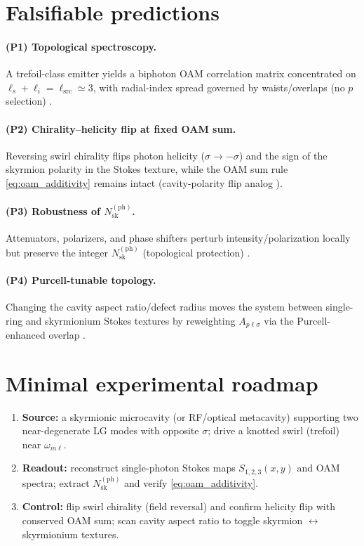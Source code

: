 \documentclass[12pt]{article}
\begin{document}
\section{Falsifiable predictions}

\paragraph{(P1) Topological spectroscopy.} A trefoil-class emitter yields a biphoton OAM correlation matrix concentrated on $\ell_s+\ell_i=\ell_\textrm{src}\simeq 3$, with radial-index spread governed by waists/overlaps (no $p$ selection) \cite{Walborn2010SPDCReview,Kopf2025OAMConservation}.

\paragraph{(P2) Chirality--helicity flip at fixed OAM sum.} Reversing swirl chirality flips photon helicity ($\sigma\to-\sigma$) and the sign of the skyrmion polarity in the Stokes texture, while the OAM sum rule \eqref{eq:oam_additivity} remains intact (cavity-polarity flip analog \cite{Ma2025NanoPhotonSkyrmions}).

\paragraph{(P3) Robustness of $N_\textrm{sk}^{(\mathrm{ph})}$.} Attenuators, polarizers, and phase shifters perturb intensity/polarization locally but preserve the integer $N_\textrm{sk}^{(\mathrm{ph})}$ (topological protection) \cite{Ma2025NanoPhotonSkyrmions}.

\paragraph{(P4) Purcell-tunable topology.} Changing the cavity aspect ratio/defect radius moves the system between single-ring and skyrmionium Stokes textures by reweighting ${A_{p\ell\sigma}}$ via the Purcell-enhanced overlap \cite{Purcell1946,Ma2025NanoPhotonSkyrmions}.

\section{Minimal experimental roadmap}

\begin{enumerate}
\item \textbf{Source:} a skyrmionic microcavity (or RF/optical metacavity) supporting two near-degenerate LG modes with opposite $\sigma$; drive a knotted swirl (trefoil) near $\omega_{m\ell}$.
\item \textbf{Readout:} reconstruct single-photon Stokes maps $S_{1,2,3}(x,y)$ and OAM spectra; extract $N_\textrm{sk}^{(\mathrm{ph})}$ and verify \eqref{eq:oam_additivity}.
\item \textbf{Control:} flip swirl chirality (field reversal) and confirm helicity flip with conserved OAM sum; scan cavity aspect ratio to toggle skyrmion $\leftrightarrow$ skyrmionium textures.
\end{enumerate}
\end{document}
